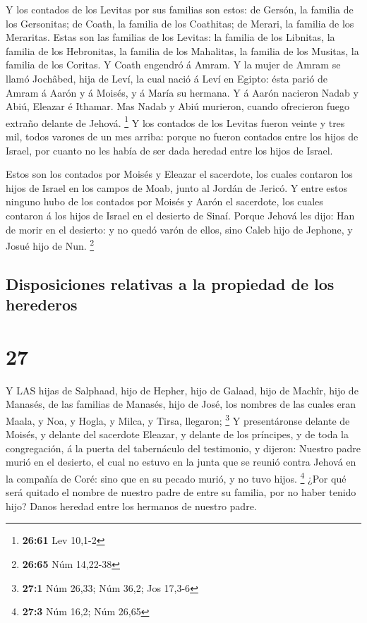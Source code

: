  Y los contados de los Levitas por sus familias son estos:
de Gersón, la familia de los Gersonitas; de Coath, la familia de los
Coathitas; de Merari, la familia de los Meraritas.  Estas
son las familias de los Levitas: la familia de los Libnitas, la familia
de los Hebronitas, la familia de los Mahalitas, la familia de los
Musitas, la familia de los Coritas. Y Coath engendró á Amram.
 Y la mujer de Amram se llamó Jochâbed, hija de Leví, la
cual nació á Leví en Egipto: ésta parió de Amram á Aarón y á Moisés, y á
María su hermana.  Y á Aarón nacieron Nadab y Abiú, Eleazar
é Ithamar.  Mas Nadab y Abiú murieron, cuando ofrecieron
fuego extraño delante de Jehová. \footnote{\textbf{26:61} Lev 10,1-2}
 Y los contados de los Levitas fueron veinte y tres mil,
todos varones de un mes arriba: porque no fueron contados entre los
hijos de Israel, por cuanto no les había de ser dada heredad entre los
hijos de Israel.

 Estos son los contados por Moisés y Eleazar el sacerdote,
los cuales contaron los hijos de Israel en los campos de Moab, junto al
Jordán de Jericó.  Y entre estos ninguno hubo de los
contados por Moisés y Aarón el sacerdote, los cuales contaron á los
hijos de Israel en el desierto de Sinaí.  Porque Jehová les
dijo: Han de morir en el desierto: y no quedó varón de ellos, sino Caleb
hijo de Jephone, y Josué hijo de Nun. \footnote{\textbf{26:65} Núm
  14,22-38}

\hypertarget{disposiciones-relativas-a-la-propiedad-de-los-herederos}{%
\subsection{Disposiciones relativas a la propiedad de los
herederos}\label{disposiciones-relativas-a-la-propiedad-de-los-herederos}}

\hypertarget{section-26}{%
\section{27}\label{section-26}}

 Y LAS hijas de Salphaad, hijo de Hepher, hijo de Galaad,
hijo de Machîr, hijo de Manasés, de las familias de Manasés, hijo de
José, los nombres de las cuales eran Maala, y Noa, y Hogla, y Milca, y
Tirsa, llegaron; \footnote{\textbf{27:1} Núm 26,33; Núm 36,2; Jos 17,3-6}
 Y presentáronse delante de Moisés, y delante del sacerdote
Eleazar, y delante de los príncipes, y de toda la congregación, á la
puerta del tabernáculo del testimonio, y dijeron:  Nuestro
padre murió en el desierto, el cual no estuvo en la junta que se reunió
contra Jehová en la compañía de Coré: sino que en su pecado murió, y no
tuvo hijos. \footnote{\textbf{27:3} Núm 16,2; Núm 26,65} 
¿Por qué será quitado el nombre de nuestro padre de entre su familia,
por no haber tenido hijo? Danos heredad entre los hermanos de nuestro
padre.


